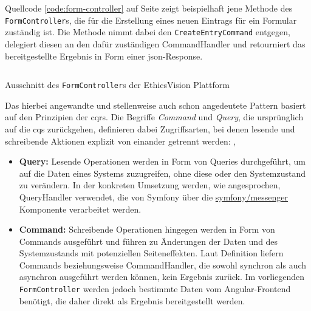 \documentclass[a4paper,12pt,twoside,numbers=noendperiod]{scrreprt}
\begin{document}
\clearpage

Quellcode \ref{code:form-controller} auf Seite \pageref{code:form-controller} zeigt beispielhaft jene Methode des \texttt{FormController}s, die für die Erstellung eines neuen Eintrags für ein Formular zuständig ist. Die Methode nimmt dabei den \texttt{CreateEntryCommand} entgegen, delegiert diesen an den dafür zuständigen CommandHandler und retourniert das bereitgestellte Ergebnis in Form einer \ac{json}-Response.

\begin{listing}[ht]
    \inputminted[fontsize=\footnotesize,linenos,xleftmargin=8mm,breaklines]{php}{code/Luidold_Form-Controller.php}
    \caption{Ausschnitt des \texttt{FormController}s der EthicsVision Plattform}
    \label{code:form-controller}
\end{listing}

Das hierbei angewandte und stellenweise auch schon angedeutete Pattern basiert auf den Prinzipien der \ac{cqrs}. Die Begriffe \textit{Command} und \textit{Query}, die ursprünglich auf die \ac{cqs} zurückgehen, definieren dabei Zugriffsarten, bei denen lesende und schreibende Aktionen explizit von einander getrennt werden: \cite{noauthor_cqrs_2010, fowler_commandqueryseparation_2005}, \cite[238\psq]{ingeno_software_2018}

\begin{itemize}
    \item \textbf{Query:} Lesende Operationen werden in Form von Queries durchgeführt, um auf die Daten eines Systems zuzugreifen, ohne diese oder den Systemzustand zu verändern. In der konkreten Umsetzung werden, wie angesprochen, QueryHandler verwendet, die von Symfony über die \url{symfony/messenger} Komponente verarbeitet werden. \cite{fowler_commandqueryseparation_2005} \cite[238\psq]{ingeno_software_2018}
    \item \textbf{Command:} Schreibende Operationen hingegen werden in Form von Commands ausgeführt und führen zu Änderungen der Daten und des Systemzustands mit potenziellen Seiteneffekten. Laut Definition liefern Commands beziehungsweise CommandHandler, die sowohl synchron als auch asynchron ausgeführt werden können, kein Ergebnis zurück. Im vorliegenden \texttt{FormController} werden jedoch bestimmte Daten vom Angular-Frontend benötigt, die daher direkt als Ergebnis bereitgestellt werden. \cite{fowler_commandqueryseparation_2005} \cite[238\psq]{ingeno_software_2018}
\end{itemize}
\end{document}
